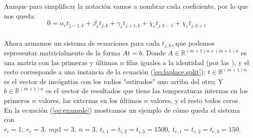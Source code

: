 \documentclass[12pt]{article}
\newcommand{\sub}[3]{\ensuremath{#1_{#2,#3}}}
\begin{document}
Aunque para simplificar la notación vamos a nombrar cada coeficiente, por lo que nos queda: \\ %
\begin{equation}
\label{eq:laplace.split}
0 = \alpha_r\sub{t}{j-1}{k} + \beta_r\sub{t}{j}{k} + \gamma_r\sub{t}{j+1}{k} + \chi_r\sub{t}{j}{k-1} + \chi_r\sub{t}{j}{k+1}
\end{equation}

\paragraph{} Ahora armamos un sistema de ecuaciones para cada \(\sub{t}{j}{k}\), que podemos representar matricialmente de la forma \(At = b\). Donde \(A \in \mathbb{R}^{(m+1)n \times (m+1)n}\) es una matriz con las primeras y últimas \(n\) filas iguales a la identidad (por las ), y el resto corresponde a una instancia de la ecuación (\ref{eq:laplace.split}); \(t \in \mathbb{R}^{(m+1)n}\) es el vector de incógntias con los radios "estirados" uno arriba del otro; Y  \(b \in \mathbb{R}^{(m+1)n}\) es el vector de resultados que tiene las temperaturas internas en los primeros \(n\) valores, las externas en los últimos \(n\) valores, y el resto todos ceros. \\
En la ecuación (\ref{eq:example}) mostramos un ejemplo de cómo queda el sistema con \(r_i = 1,\ r_e = 3,\ mp1 = 3,\ n = 3,\ \sub{t}{i}{1} = \sub{t}{i}{2} = \sub{t}{i}{3} = 1500,\ \sub{t}{e}{1} = \sub{t}{e}{2} = \sub{t}{e}{3} = 150\).
\end{document}
